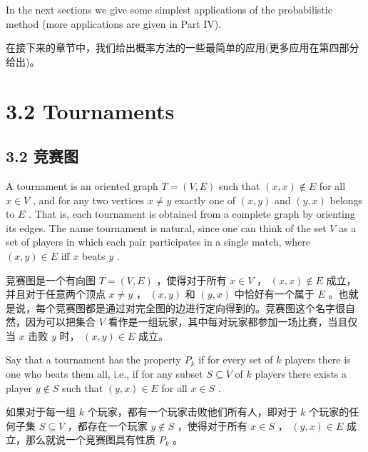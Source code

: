 \documentclass[10pt]{article}
\begin{document}
In the next sections we give some simplest applications of the probabilistic method (more applications are given in Part IV).

\begin{tcolorbox}\relax
在接下来的章节中，我们给出概率方法的一些最简单的应用(更多应用在第四部分给出)。
\end{tcolorbox}

\section*{3.2 Tournaments}

\begin{tcolorbox}\relax
\section*{3.2 竞赛图}
\end{tcolorbox}

A tournament is an oriented graph \(T = \left( {V,E}\right)\) such that \(\left( {x,x}\right)  \notin  E\) for all \(x \in  V\) , and for any two vertices \(x \neq  y\) exactly one of \(\left( {x,y}\right)\) and \(\left( {y,x}\right)\) belongs to \(E\) . That is, each tournament is obtained from a complete graph by orienting its edges. The name tournament is natural, since one can think of the set \(V\) as a set of players in which each pair participates in a single match, where \(\left( {x,y}\right)  \in  E\) iff \(x\) beats \(y\) .

\begin{tcolorbox}\relax
竞赛图是一个有向图 \(T = \left( {V,E}\right)\) ，使得对于所有 \(x \in  V\) ， \(\left( {x,x}\right)  \notin  E\) 成立，并且对于任意两个顶点 \(x \neq  y\) ， \(\left( {x,y}\right)\) 和 \(\left( {y,x}\right)\) 中恰好有一个属于 \(E\) 。也就是说，每个竞赛图都是通过对完全图的边进行定向得到的。竞赛图这个名字很自然，因为可以把集合 \(V\) 看作是一组玩家，其中每对玩家都参加一场比赛，当且仅当 \(x\) 击败 \(y\) 时， \(\left( {x,y}\right)  \in  E\) 成立。
\end{tcolorbox}

Say that a tournament has the property \({P}_{k}\) if for every set of \(k\) players there is one who beats them all, i.e., if for any subset \(S \subseteq  V\) of \(k\) players there exists a player \(y \notin  S\) such that \(\left( {y,x}\right)  \in  E\) for all \(x \in  S\) .

\begin{tcolorbox}\relax
如果对于每一组 \(k\) 个玩家，都有一个玩家击败他们所有人，即对于 \(k\) 个玩家的任何子集 \(S \subseteq  V\) ，都存在一个玩家 \(y \notin  S\) ，使得对于所有 \(x \in  S\) ， \(\left( {y,x}\right)  \in  E\) 成立，那么就说一个竞赛图具有性质 \({P}_{k}\) 。
\end{tcolorbox}
\end{document}
